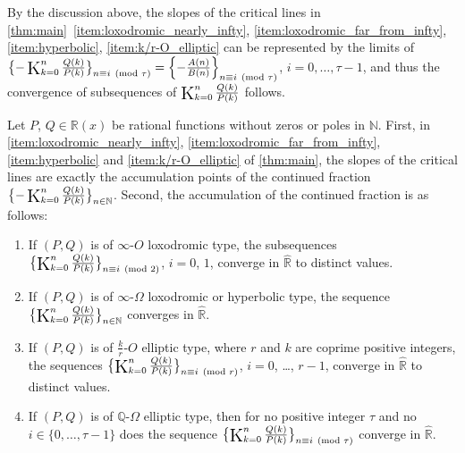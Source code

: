 \documentclass[a4paper,UKenglish,cleveref,autoref,thm-restate]{lipics-v2021}
\newcommand{\R}{\mathbb{R}}
\newcommand{\N}{\mathbb{N}}
\newcommand{\Q}{\mathbb{Q}}
\newcommand\Kettenbruch{\operatornamewithlimits{\mathchoice
     {\vcenter{\hbox{\huge $\mathrm{K}$}}}
     {\vcenter{\hbox{\Large $\mathrm{K}$}}}
     {\mathrm{K}}
     {\mathrm{K}}}}
\begin{document}
By the discussion above, the slopes of the critical lines in \cref{thm:main}~\eqref{item:loxodromic_nearly_infty}, \eqref{item:loxodromic_far_from_infty}, \eqref{item:hyperbolic}, \eqref{item:k/r-O_elliptic} can be represented by the limits of $\bigl\{ -\Kettenbruch _{k=0}^{n} \frac{Q(k)}{P(k)} \bigr\}_{n \equiv i \pmod{\tau}} = \left\{ -\frac{A(n)}{B(n)} \right\}_{n \equiv i \pmod{\tau}}$, $i=0, \dots, \tau-1$, and thus the convergence of subsequences of $\Kettenbruch_{k=0}^n \frac{Q(k)}{P(k)}$ follows. 

\begin{theorem}\label{thm:subcfrac_converge}
Let $P$, $Q \in \R(x)$ be rational functions without zeros or poles in $\N$. First, in \eqref{item:loxodromic_nearly_infty}, \eqref{item:loxodromic_far_from_infty}, \eqref{item:hyperbolic} and \eqref{item:k/r-O_elliptic} of \cref{thm:main}, the slopes of the critical lines are exactly the accumulation points of the continued fraction $\bigl\{ -\Kettenbruch _{k=0}^{n} \frac{Q(k)}{P(k)} \bigr\}_{n \in \N}$. Second, the accumulation of the continued fraction is as follows:
\begin{enumerate}[(1)]
\item \label{item:cfrac_O_lox}
If $(P, Q)$ is of $\infty$-$O$ loxodromic type, 
the subsequences
$\bigl\{ \Kettenbruch _{k=0}^{n} \frac{Q(k)}{P(k)} \bigr\}_{n \equiv i \pmod{2}}$, $i = 0$, $1$, converge in $\hat{\R}$ to 
distinct values. 

\item \label{item:cfrac_Omega_lox}
If $(P, Q)$ is of $\infty$-$\Omega$ loxodromic or hyperbolic type, 
the sequence $\bigl\{ \Kettenbruch _{k=0}^{n} \frac{Q(k)}{P(k)} \bigr\}_{n\in\N}$ converges in $\hat{\R}$. 

\item \label{item:cfrac_O_ell}
If $(P, Q)$ is of $\frac{k}r$-$O$ elliptic type, where $r$ and $k$ are coprime positive integers, 
the sequences $\bigl\{ \Kettenbruch _{k=0}^{n} \frac{Q(k)}{P(k)} \bigr\} _{n \equiv i \pmod{r}}$, $i = 0$, \ldots, $r-1$, converge in $\hat{\R}$ to distinct values.  

\item \label{item:cfrac_Omega_ell}
If $(P, Q)$ is of $\Q$-$\Omega$ elliptic type, 
then for no positive integer $\tau$ and no $i \in \{ 0, \dots, \tau - 1 \}$ does the sequence $\bigl\{ \Kettenbruch _{k=0}^{n} \frac{Q(k)}{P(k)} \bigr\}_{n \equiv i \pmod{\tau}}$ converge in $\hat{\R}$. 
\end{enumerate}
\end{theorem}
\end{document}
